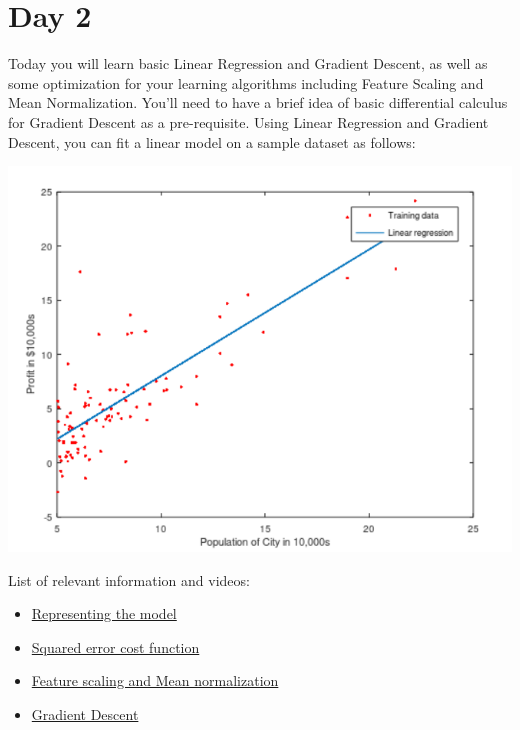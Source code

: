 \documentclass[11pt]{article}
\begin{document}
\section{Day 2}
Today you will learn basic Linear Regression and Gradient Descent, as well as some optimization for your learning algorithms including Feature Scaling and Mean Normalization. You'll need to have a brief idea of basic differential calculus for Gradient Descent as a pre-requisite. Using Linear Regression and Gradient Descent, you can fit a linear model on a sample dataset as follows:\\
\begin{center}
\includegraphics[scale=.7]{img/simplifiedGd.png}
\end{center}
List of relevant information and videos:
\begin{itemize}
\item \href{https://www.youtube.com/watch?v=kHwlB_j7Hkc}{Representing the model}
\item \href{https://www.youtube.com/watch?v=yuH4iRcggMw}{Squared error cost function}
\item \href{https://www.youtube.com/watch?v=e1nTgoDI_m8}{Feature scaling and Mean normalization}
\item \href{https://www.youtube.com/watch?v=YovTqTY-PYY}{Gradient Descent}
\end{itemize}
\pagebreak
\end{document}
